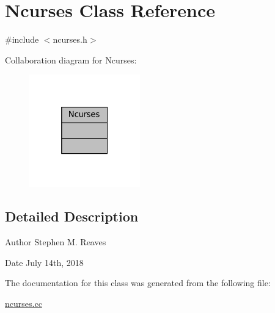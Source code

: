 \hypertarget{classNcurses}{}\section{Ncurses Class Reference}
\label{classNcurses}


{\ttfamily \#include $<$ncurses.\+h$>$}



Collaboration diagram for Ncurses\+:
\nopagebreak
\begin{figure}[H]
\begin{center}
\leavevmode
\includegraphics[width=136pt]{classNcurses__coll__graph}
\end{center}
\end{figure}


\subsection{Detailed Description}
\begin{DoxyAuthor}{Author}
Stephen M. Reaves 
\end{DoxyAuthor}
\begin{DoxyDate}{Date}
July 14th, 2018 
\end{DoxyDate}


The documentation for this class was generated from the following file\+:\begin{DoxyCompactItemize}
\item 
\mbox{\hyperlink{ncurses_8cc}{ncurses.\+cc}}\end{DoxyCompactItemize}
